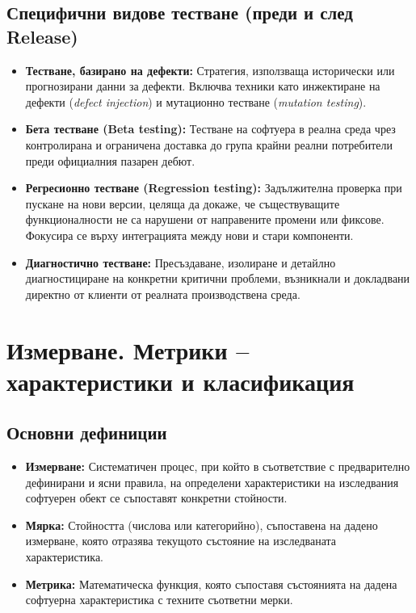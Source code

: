 \documentclass{scrartcl}
\begin{document}
\begin{FlushLeft}
\subsection{Специфични видове тестване (преди и след Release)}
\begin{itemize}
    \item \textbf{Тестване, базирано на дефекти:} Стратегия, използваща исторически или прогнозирани данни за дефекти. Включва техники като инжектиране на дефекти (\textit{defect injection}) и мутационно тестване (\textit{mutation testing}).
    \item \textbf{Бета тестване (Beta testing):} Тестване на софтуера в реална среда чрез контролирана и ограничена доставка до група крайни реални потребители преди официалния пазарен дебют.
    \item \textbf{Регресионно тестване (Regression testing):} Задължителна проверка при пускане на нови версии, целяща да докаже, че съществуващите функционалности не са нарушени от направените промени или фиксове. Фокусира се върху интеграцията между нови и стари компоненти.
    \item \textbf{Диагностично тестване:} Пресъздаване, изолиране и детайлно диагностициране на конкретни критични проблеми, възникнали и докладвани директно от клиенти от реалната производствена среда.
\end{itemize}

\section{Измерване. Метрики – характеристики и класификация}

\subsection{Основни дефиниции}
\begin{itemize}
    \item \textbf{Измерване:} Систематичен процес, при който в съответствие с предварително дефинирани и ясни правила, на определени характеристики на изследвания софтуерен обект се съпоставят конкретни стойности.
    \item \textbf{Мярка:} Стойността (числова или категорийно), съпоставена на дадено измерване, която отразява текущото състояние на изследваната характеристика.
    \item \textbf{Метрика:} Математическа функция, която съпоставя състоянията на дадена софтуерна характеристика с техните съответни мерки.
\end{itemize}


\end{FlushLeft}
\end{document}
